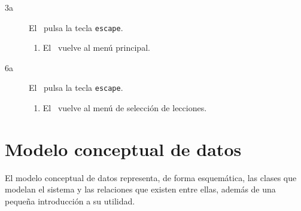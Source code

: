 \begin{description}
\begin{description}
  \item[3a] El \jugador\ pulsa la tecla \texttt{escape}.
    \begin{enumerate}
    \item El \sistema\ vuelve al menú principal.
    \end{enumerate}

  \item[6a] El \jugador\ pulsa la tecla \texttt{escape}.
    \begin{enumerate}
    \item El \sistema\ vuelve al menú de selección de lecciones.
    \end{enumerate}

  \end{description}  
\end{description}

\section{Modelo conceptual de datos}

El modelo conceptual de datos representa, de forma esquemática, las clases que
modelan el sistema y las relaciones que existen entre ellas, además de una
pequeña introducción a su utilidad. 

